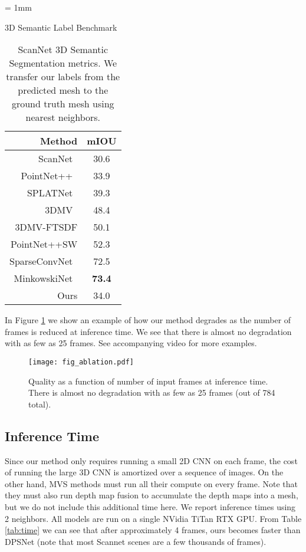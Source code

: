 \documentclass[runningheads]{llncs}
\begin{document}
 \tabcolsep= 1mm
 \begin{table}[t]
     \centering
     \caption{3D Semantic Label Benchmark}
\begin{tabular}{rc}
     \hline
             \small{Method}  & \small{mIOU} \\
    \hline
        ScanNet~\cite{dai2017scannet}  & 30.6\\
        PointNet++~\cite{qi2017pointnet} & 33.9\\
        SPLATNet~\cite{su2018splatnet} & 39.3 \\
        3DMV~\cite{dai20183dmv} & 48.4 \\
        3DMV-FTSDF & 50.1 \\
        PointNet++SW & 52.3 \\
        SparseConvNet~\cite{graham20183d} & 72.5 \\
        MinkowskiNet~\cite{choy20194d} & \textbf{73.4} \\
    \hline
        Ours & 34.0 \\
    \hline
    \end{tabular}
\label{tab:scannet}
    \caption*{\small{ScanNet 3D Semantic Segmentation metrics. We transfer our labels from the predicted mesh to the ground truth mesh using nearest neighbors.}}
\end{table}


In Figure \ref{fig:ablation} we show an example of how our method degrades as the number of frames is reduced at inference time. We see that there is almost no degradation with as few as 25 frames. See accompanying video for more examples.

\begin{figure}
\centering
\texttt{[image: fig\_ablation.pdf]}
\caption{Quality as a function of number of input frames at inference time.
There is almost no degradation with as few as 25 frames (out of 784 total).
}
\label{fig:ablation}
\end{figure}


\subsection{Inference Time}
Since our method only requires running a small 2D CNN on each frame, the cost of running the large 3D CNN is amortized over a sequence of images.
On the other hand, MVS methods must run all their compute on every frame.
Note that they must also run depth map fusion to accumulate the depth maps into a mesh, but we do not include this additional time here.
We report inference times using 2 neighbors.
All models are run on a single NVidia TiTan RTX GPU.
From Table \ref{tab:time} we can see that after approximately 4 frames, ours becomes faster than DPSNet (note that most Scannet scenes are a few thousands of frames).
\end{document}
